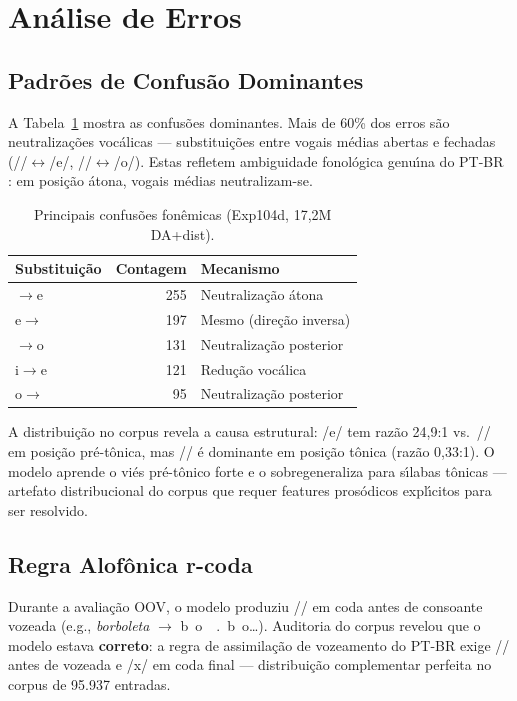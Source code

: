 \documentclass[12pt]{article}
\newcommand{\ipaE}{\textipa{E}}%
\newcommand{\ipaO}{\textipa{O}}%
\newcommand{\ipaG}{\textipa{G}}%
\begin{document}
\section{An\'alise de Erros}

\subsection{Padr\~oes de Confus\~ao Dominantes}

A Tabela~\ref{tab:confusions} mostra as confus\~oes dominantes.
Mais de 60\% dos erros s\~ao neutraliza\c{c}\~oes voc\'alicas ---
substitui\c{c}\~oes entre vogais m\'edias abertas e fechadas
(/\ipaE{}/$\leftrightarrow$/e/,
/\ipaO{}/$\leftrightarrow$/o/). Estas refletem ambiguidade
fonol\'ogica genu\'{\i}na do PT-BR \cite{barbosa2004brazilian}: em
posi\c{c}\~ao \'atona, vogais m\'edias neutralizam-se.

\begin{table}[ht]
\centering
\caption{Principais confus\~oes fon\^emicas (Exp104d, 17,2M DA+dist).}
\label{tab:confusions}
\begin{tabular}{lrl}
\toprule
\textbf{Substitui\c{c}\~ao} & \textbf{Contagem} & \textbf{Mecanismo} \\
\midrule
\ipaE{}$\to$e & 255 & Neutraliza\c{c}\~ao \'atona \\
e$\to$\ipaE{} & 197 & Mesmo (dire\c{c}\~ao inversa) \\
\ipaO{}$\to$o & 131 & Neutraliza\c{c}\~ao posterior \\
i$\to$e      & 121 & Redu\c{c}\~ao voc\'alica \\
o$\to$\ipaO{} & 95 & Neutraliza\c{c}\~ao posterior \\
\bottomrule
\end{tabular}
\end{table}

A distribui\c{c}\~ao no corpus revela a causa estrutural: /e/ tem
raz\~ao 24,9:1 vs.\ /\ipaE{}/ em posi\c{c}\~ao pr\'e-t\^onica, mas
/\ipaE{}/ \'e dominante em posi\c{c}\~ao t\^onica (raz\~ao 0,33:1).
O modelo aprende o vi\'es pr\'e-t\^onico forte e o sobregeneraliza
para s\'{\i}labas t\^onicas --- artefato distribucional do corpus que
requer features pros\'odicos expl\'{\i}citos para ser resolvido.

\subsection{Regra Alof\^onica r-coda}

Durante a avalia\c{c}\~ao OOV, o modelo produziu /\ipaG{}/ em coda
antes de consoante vozeada (e.g., \emph{borboleta} $\to$
b~o~\ipaG{}~.~b~o\ldots). Auditoria do corpus revelou que o modelo
estava \textbf{correto}: a regra de assimila\c{c}\~ao de vozeamento do
PT-BR \cite{barbosa2004brazilian} exige /\ipaG{}/ antes de vozeada e
/x/ em coda final --- distribui\c{c}\~ao complementar perfeita no corpus
de 95.937 entradas.
\end{document}
